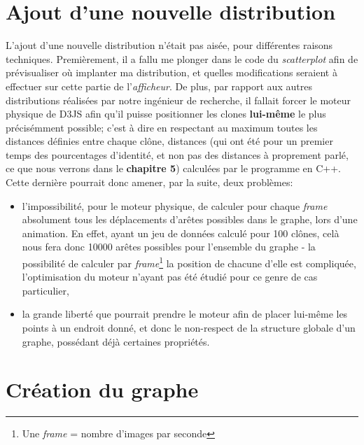\documentclass[pdftex,12pt,a4paper]{report}
\begin{document}
\begin{spacing}{1.2}
\section{Ajout d'une nouvelle distribution}
L'ajout d'une nouvelle distribution n'était pas aisée, pour différentes raisons techniques.
\newline
Premièrement, il a fallu me plonger dans le code du \textit{scatterplot} afin de prévisualiser où implanter ma distribution, et quelles modifications seraient à effectuer sur cette partie de l'\textit{afficheur}.
\newline
De plus, par rapport aux autres distributions réalisées par notre ingénieur de recherche, il fallait forcer le moteur physique de D3JS afin qu'il puisse positionner les clones \textbf{lui-même} le plus précisémment possible; c'est à dire en respectant au maximum toutes les distances définies entre chaque clône, distances (qui ont été pour un premier temps des pourcentages d'identité, et non pas des distances à proprement parlé, ce que nous verrons dans le \textbf{chapitre 5}) calculées par le programme en C++.
\newline
Cette dernière pourrait donc amener, par la suite, deux problèmes: 
\begin{itemize}
\item{l'impossibilité, pour le moteur physique, de calculer pour chaque \textit{frame} absolument tous les déplacements d'arêtes possibles dans le graphe, lors d'une animation. En effet, ayant un jeu de données calculé pour 100 clônes, celà nous fera donc 10000 arêtes possibles pour l'ensemble du graphe - la possibilité de calculer par \textit{frame}\footnote{Une \textit{frame} = nombre d'images par seconde} la position de chacune d'elle est compliquée, l'optimisation du moteur n'ayant pas été étudié pour ce genre de cas particulier,}
\item{la grande liberté que pourrait prendre le moteur afin de placer lui-même les points à un endroit donné, et donc le non-respect de la structure globale d'un graphe, possédant déjà certaines propriétés.}
\end{itemize}

\section{Création du graphe}


\end{spacing}
\end{document}
